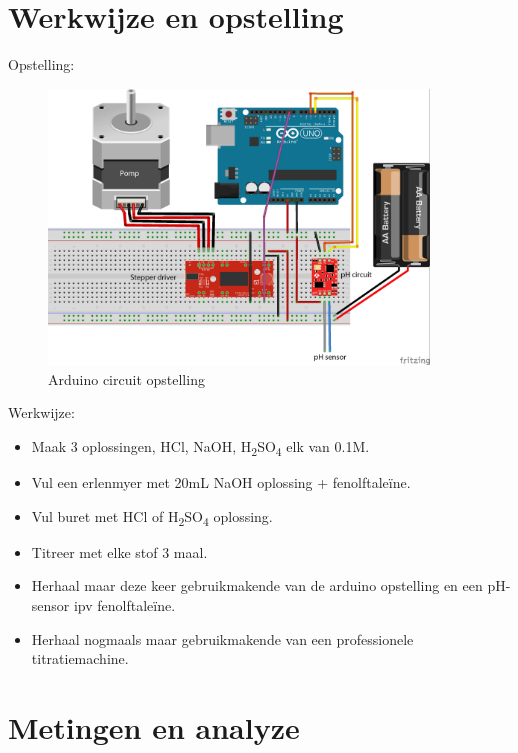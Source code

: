 \documentclass[11pt]{report}
\begin{document}
\newpage

\section{Werkwijze en opstelling}
Opstelling:
\begin{figure}[H]
    \centering
    \includegraphics[width=0.9\textwidth]{opstelling.jpg}
    \caption{Arduino circuit opstelling}
\end{figure}
Werkwijze:
\begin{itemize}
    \item Maak 3 oplossingen, HCl, NaOH, H\textsubscript{2}SO\textsubscript{4} elk van 0.1M.
    \item Vul een erlenmyer met 20mL NaOH oplossing + fenolftaleïne.
    \item Vul buret met HCl of H\textsubscript{2}SO\textsubscript{4} oplossing.
    \item Titreer met elke stof 3 maal.
    \item Herhaal maar deze keer gebruikmakende van de arduino opstelling en een pH-sensor ipv fenolftaleïne.
    \item Herhaal nogmaals maar gebruikmakende van een professionele titratiemachine.
\end{itemize}

\newpage

\section{Metingen en analyze}
\end{document}
